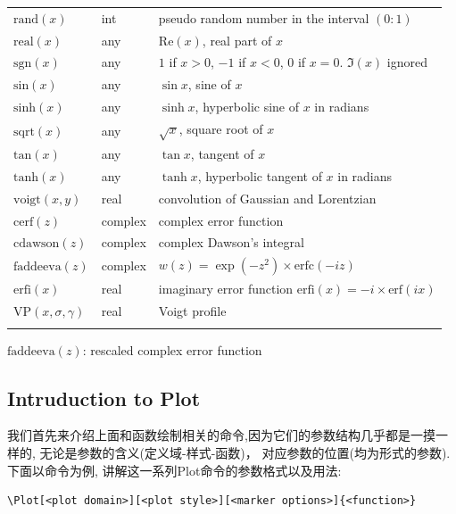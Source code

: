 \documentclass[
  hyper,    
  lang=cn,
  class=book,
  bib_index={load},
  mathSpec={envStyle=leftbar, alias},
  toc={column=2, title=目录},
]{zlatex}
\let\cmd\ztexverb
\begin{document}
\begin{center}
\begin{longtable}{lll}
        \(\text{rand}(x)\) & int & pseudo random number in the interval $(0:1)$ \\
        \(\text{real}(x)\) & any & $\text{Re}(x)$, real part of $x$ \\
        \(\text{sgn}(x)\) & any & $1$ if $x > 0$, $-1$ if $x < 0$, $0$ if $x = 0$. $\Im(x)$ ignored \\
        \(\text{sin}(x)\) & any & $\sin x$, sine of $x$ \\
        \(\text{sinh}(x)\) & any & $\sinh x$, hyperbolic sine of $x$ in radians \\
        \(\text{sqrt}(x)\) & any & $\sqrt{x}$, square root of $x$ \\
        \(\text{tan}(x)\) & any & $\tan x$, tangent of $x$ \\
        \(\text{tanh}(x)\) & any & $\tanh x$, hyperbolic tangent of $x$ in radians \\
        \(\text{voigt}(x,y)\) & real & convolution of Gaussian and Lorentzian \\
        \(\text{cerf}(z)\) & complex & complex error function \\
        \(\text{cdawson}(z)\) & complex & complex Dawson's integral \\
        \(\text{faddeeva}(z)\) & complex & $w(z) = \exp(-z^2) \times \text{erfc}(-iz)$ \\
        \(\text{erfi}(x)\) & real & imaginary error function $\text{erfi}(x) = -i \times \text{erf}(ix)$ \\
        \(\text{VP}(x,\sigma,\gamma)\) & real & Voigt profile \\
        \bottomrule 
        \label{tab:gnuplot-functions}\\
    \end{longtable}
\end{center}
\vspace*{-4em}

\begin{remark}
    \(\text{faddeeva}(z)\): rescaled complex error function
\end{remark}

\subsection{Intruduction to Plot}
我们首先来介绍上面和函数绘制相关的命令,因为它们的参数结构几乎都是一摸一样的, 无论是参数的含义(定义域-样式-函数)，
对应参数的位置(均为\cmd{{OOm}}形式的参数). 下面以\cmd{\Plot}命令为例, 讲解这一系列Plot命令的参数格式以及用法:
\begin{verbatim}
\Plot[<plot domain>][<plot style>][<marker options>]{<function>}
\end{verbatim}
\end{document}
